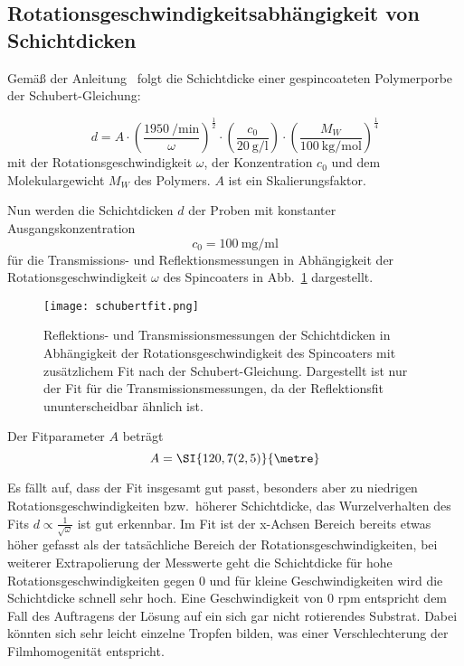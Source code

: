\subsection{Rotationsgeschwindigkeitsabhängigkeit von Schichtdicken\label{sec:rotgeschw}}
Gemäß der Anleitung~\cite{Anleitung} folgt die Schichtdicke einer gespincoateten Polymerporbe der Schubert-Gleichung:

\begin{equation}\label{eq:schubert}
    d = A \cdot \left(\frac{\SI{1950}{\per\minute}}{\omega}\right)^\frac{1}{2} \cdot \left(\frac{c_0}{\SI{20}{\gram\per\litre}}\right) \cdot \left(\frac{M_W}{\SI{100}{\kilo\gram\per\mol}}\right)^\frac{1}{4}
\end{equation}
mit der Rotationsgeschwindigkeit $\omega$, der Konzentration $c_0$ und dem Molekulargewicht $M_W$ des Polymers. $A$ ist ein Skalierungsfaktor.

Nun werden die Schichtdicken $d$ der Proben mit konstanter Ausgangskonzentration 
\begin{equation*}
    c_0 = \SI{100}{\milli\gram\per\milli\litre}
\end{equation*} 
für die Transmissions- und Reflektionsmessungen in Abhängigkeit der Rotationsgeschwindigkeit $\omega$ des Spincoaters in Abb.~\ref{fig:schubertfit} dargestellt.

\begin{figure}[h!]
    \centering
    \texttt{[image: schubertfit.png]}
    \caption{Reflektions- und Transmissionsmessungen der Schichtdicken in Abhängigkeit der Rotationsgeschwindigkeit des Spincoaters mit zusätzlichem Fit nach der Schubert-Gleichung. Dargestellt ist nur der Fit für die Transmissionsmessungen, da der Reflektionsfit ununterscheidbar ähnlich ist.}
    \label{fig:schubertfit}
\end{figure}

Der Fitparameter $A$ beträgt
\begin{equation*}
    A = \SI{120,7(2,5)}{\metre}
\end{equation*}

Es fällt auf, dass der Fit insgesamt gut passt, besonders aber zu niedrigen Rotationsgeschwindigkeiten bzw.~höherer Schichtdicke, das Wurzelverhalten des Fits $d \propto \frac{1}{\sqrt{\omega}}$ ist gut erkennbar. Im Fit ist der x-Achsen Bereich bereits etwas höher gefasst als der tatsächliche Bereich der Rotationsgeschwindigkeiten, bei weiterer Extrapolierung der Messwerte geht die Schichtdicke für hohe Rotationsgeschwindigkeiten gegen 0 und für kleine Geschwindigkeiten wird die Schichtdicke schnell sehr hoch. Eine Geschwindigkeit von 0 rpm entspricht dem Fall des Auftragens der Lösung auf ein sich gar nicht rotierendes Substrat. Dabei könnten sich sehr leicht einzelne Tropfen bilden, was einer Verschlechterung der Filmhomogenität entspricht. 